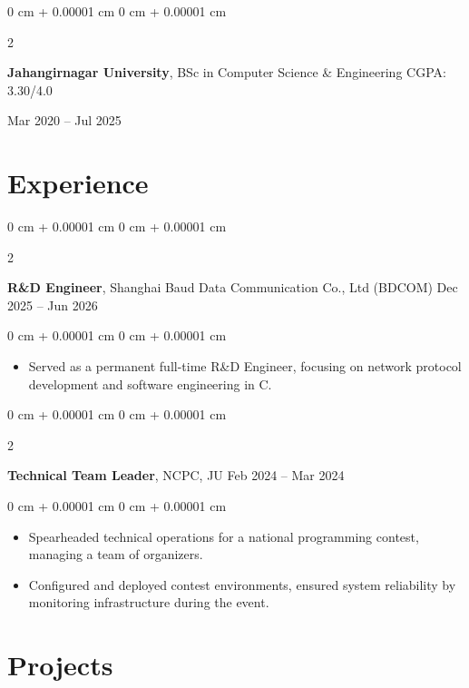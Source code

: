 \documentclass[10pt, letterpaper]{article}
\newenvironment{highlights}{
	\begin{itemize}[
		topsep=0.10 cm,
		parsep=0.10 cm,
		partopsep=0pt,
		itemsep=0pt,
		leftmargin=0 cm + 10pt
		]
	}{
	\end{itemize}
} %
\newenvironment{onecolentry}{
	\begin{adjustwidth}{
			0 cm + 0.00001 cm
		}{
			0 cm + 0.00001 cm
		}
	}{
	\end{adjustwidth}
} %
\newenvironment{twocolentry}[2][]{
	\onecolentry
	\def\secondColumn{#2}
	\setcolumnwidth{\fill, 4.5 cm}
	\begin{paracol}{2}
	}{
		\switchcolumn \raggedleft \secondColumn
	\end{paracol}
	\endonecolentry
} %
\begin{document}
	\vspace{0.2 cm}
	
	\begin{twocolentry}{
			Mar 2020 – Jul 2025
		}
		\textbf{Jahangirnagar University}, BSc in Computer Science \& Engineering \hfill CGPA: 3.30/4.0
	\end{twocolentry}
	
	
	
	
	\section{Experience}
	
	\begin{twocolentry}{
			Dec 2025 – Jun 2026
		}
		\textbf{R\&D Engineer}, Shanghai Baud Data Communication Co., Ltd (BDCOM)\end{twocolentry}
	
	\vspace{0.10 cm}
	\begin{onecolentry}
		\begin{highlights}
			\item Served as a permanent full-time R\&D Engineer, focusing on network protocol development and software engineering in C.
		\end{highlights}
	\end{onecolentry}
	
	\vspace{0.2 cm}
	

	\begin{twocolentry}{
			Feb 2024 – Mar 2024
		}
		\textbf{Technical Team Leader}, NCPC, JU \end{twocolentry}
	
	\vspace{0.10 cm}
	\begin{onecolentry}
		\begin{highlights}
			\item Spearheaded technical operations for a national programming contest, managing a team of organizers.
			\item Configured and deployed contest environments, ensured system reliability by monitoring infrastructure during the event.
		\end{highlights}
	\end{onecolentry}
	
	\section{Projects}
	
\end{document}
